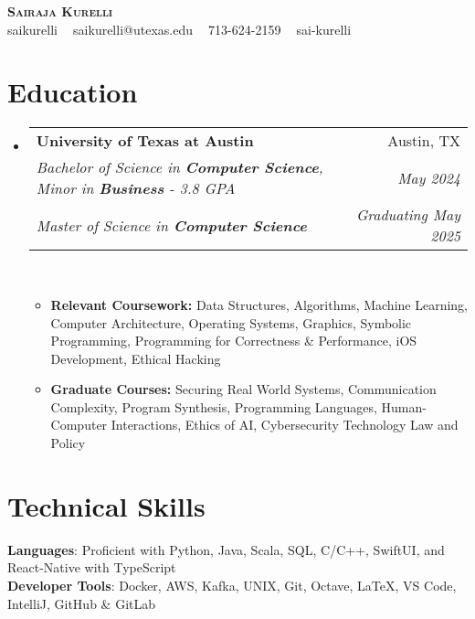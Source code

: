 \documentclass[letterpaper,11pt]{article}
\makeatletter
\newcommand{\resumeItem}[1]{
  \item\small{
    {#1 \vspace{-2pt}}
  }
}
\newcommand{\resumeSubLineheading}[6]{
  \vspace{-2pt}\item
    \begin{tabular*}{0.97\textwidth}[t]{l@{\extracolsep{\fill}}r}
      \textbf{#1} & #2 \\
      \textit{\small#4} & \textit{\small #6} \\
      \textit{\small#3} & \textit{\small #5} \\
    \end{tabular*}\vspace{-7pt}
}
\newcommand{\resumeSubHeadingListStart}{\begin{itemize}[leftmargin=0.15in, label={}]}
\newcommand{\resumeSubHeadingListEnd}{\end{itemize}}
\newcommand{\resumeItemListStart}{\begin{itemize}}
\newcommand{\resumeItemListEnd}{\end{itemize}\vspace{-5pt}}
\makeatother
\begin{document}

\begin{center}
  \textbf{\huge \scshape Sairaja Kurelli} \\ \vspace{3pt}
  \small \faGithub{} saikurelli $\;\;$ \faEnvelope{} saikurelli@utexas.edu $\;\;$ \faPhone{} 713-624-2159 $\;\;$\faLinkedin{} sai-kurelli
\end{center}


\section{Education}
\resumeSubHeadingListStart
\resumeSubLineheading
{University of Texas at Austin}{Austin, TX}
{Master of Science in \textbf{Computer Science}}
{Bachelor of Science in \textbf{Computer Science}, Minor in \textbf{Business} - 3.8 GPA}{Graduating May 2025} {May 2024}
\\
\resumeItemListStart
\resumeItem{\small \textbf{Relevant Coursework:} Data Structures, Algorithms, Machine Learning,
  Computer Architecture, Operating Systems, Graphics, Symbolic Programming, Programming for Correctness \& Performance,
  iOS Development, Ethical Hacking}
\resumeItem{\small \textbf{Graduate Courses:} Securing Real World Systems, Communication Complexity, Program Synthesis, Programming Languages, Human-Computer Interactions, Ethics of AI, Cybersecurity Technology Law and Policy}
\resumeItemListEnd
\resumeSubHeadingListEnd


\section{Technical Skills}
\begin{itemize}[leftmargin=0.15in, label={}]
  \normalsize{\item{
        \textbf{Languages}{: Proficient with Python, Java, Scala, SQL, C/C++, SwiftUI, and React-Native with TypeScript} \\
        \textbf{Developer Tools}{: Docker, AWS, Kafka, UNIX, Git, Octave, LaTeX, VS Code, IntelliJ, GitHub \& GitLab} \\
        }}
\end{itemize}
\end{document}

